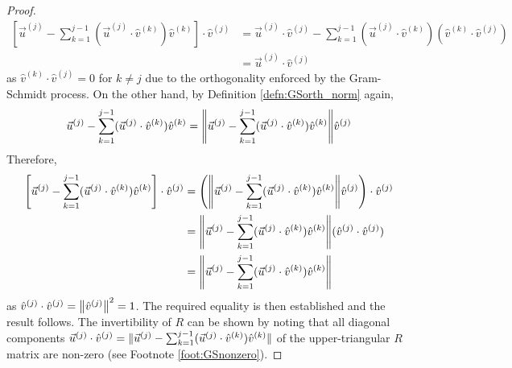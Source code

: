 \begin{proof}
\begin{align*}
\left[\vec{u}^{(j)} - \sum_{k=1}^{j-1}(\vec{u}^{(j)} \cdot \hat{v}^{(k)})\hat{v}^{(k)}\right] \cdot \hat{v}^{(j)} &= \vec{u}^{(j)} \cdot \hat{v}^{(j)} - \sum_{k=1}^{j-1}(\vec{u}^{(j)} \cdot \hat{v}^{(k)}) (\hat{v}^{(k)} \cdot \hat{v}^{(j)})\\
&= \vec{u}^{(j)} \cdot \hat{v}^{(j)}
\end{align*}
as $\hat{v}^{(k)} \cdot \hat{v}^{(j)} = 0$ for $k \neq j$ due to the orthogonality enforced by the Gram-Schmidt process. On the other hand, by Definition \ref{defn:GSorth_norm} again, 
\begin{align*}
\vec{u}^{(j)} - \sum_{k=1}^{j-1}(\vec{u}^{(j)} \cdot \hat{v}^{(k)})\hat{v}^{(k)} = \norm{\vec{u}^{(j)} - \sum_{k=1}^{j-1}(\vec{u}^{(j)} \cdot \hat{v}^{(k)})\hat{v}^{(k)}} \hat{v}^{(j)}
\end{align*}
Therefore,
\begin{align*}
\left[\vec{u}^{(j)} - \sum_{k=1}^{j-1}(\vec{u}^{(j)} \cdot \hat{v}^{(k)})\hat{v}^{(k)}\right] \cdot \hat{v}^{(j)} &= \left(\norm{\vec{u}^{(j)} - \sum_{k=1}^{j-1}(\vec{u}^{(j)} \cdot \hat{v}^{(k)})\hat{v}^{(k)}} \hat{v}^{(j)}\right) \cdot \hat{v}^{(j)} \\
&= \norm{\vec{u}^{(j)} - \sum_{k=1}^{j-1}(\vec{u}^{(j)} \cdot \hat{v}^{(k)})\hat{v}^{(k)}} (\hat{v}^{(j)} \cdot\hat{v}^{(j)}) \\
&= \norm{\vec{u}^{(j)} - \sum_{k=1}^{j-1}(\vec{u}^{(j)} \cdot \hat{v}^{(k)})\hat{v}^{(k)}}
\end{align*}
as $\hat{v}^{(j)} \cdot \hat{v}^{(j)} = \norm{\hat{v}^{(j)}}^2 = 1$. The required equality is then established and the result follows. The invertibility of $R$ can be shown by noting that all diagonal components $\vec{u}^{(j)} \cdot \hat{v}^{(j)} = \norm{\smash{\vec{u}^{(j)} - \sum_{k=1}^{j-1}(\vec{u}^{(j)} \cdot \hat{v}^{(k)})\hat{v}^{(k)}}} $ of the upper-triangular $R$ matrix are non-zero (see Footnote \ref{foot:GSnonzero}). 
\end{proof}

